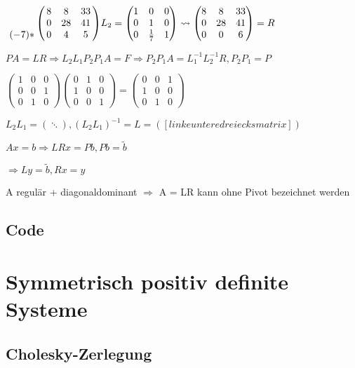 \documentclass[12pt,a4paper]{article} %
\begin{document}
	$\bordermatrix{ ~ & & & \cr
		& 8 & 8 & 33 \cr
		& 0 & 28 & 41 \cr
		(-7) * & 0 & 4 & 5
	}
	L_2 = \begin{pmatrix}
	1 & 0 & 0 \\
	0 & 1 & 0 \\
	0 & \frac{1}{7} & 1
	\end{pmatrix}
	\rightsquigarrow
	\begin{pmatrix}
		8 & 8 & 33 \\
		0 & 28 & 41 \\
		0 & 0 & 6
	\end{pmatrix}
	 = R$
	
	$PA = LR \Rightarrow L_2L_1 P_2P_1 A = F \Rightarrow P_2P_1A = L_1^{-1}L_2^{-1}R, P_2P_1 = P$
	
	$\begin{pmatrix}
		1 & 0 & 0 \\
		0 & 0 & 1 \\
		0 & 1 & 0
	\end{pmatrix}
	\begin{pmatrix}
		0 & 1 & 0 \\
		1 & 0 & 0 \\
		0 & 0 & 1
	\end{pmatrix}
	=
	\begin{pmatrix}
		0 & 0 & 1 \\
		1 & 0 & 0 \\
		0 & 1 & 0
	\end{pmatrix}$
	
	$L_2L_1 = (\ddots), (L_2L_1)^{-1} = L = ([linke untere dreiecks matrix])$
	
	$Ax = b \Rightarrow LRx = Pb, Pb = \tilde{b}$
	
	$\Rightarrow Ly = \tilde{b}, Rx = y$
	
	A regulär + diagonaldominant $\Rightarrow$ A = LR kann ohne Pivot bezeichnet werden
	
	\subsection{Code}
	
	\newpage
	
	\section{Symmetrisch positiv definite Systeme}
	
	\subsection{Cholesky-Zerlegung}
	
\end{document}
